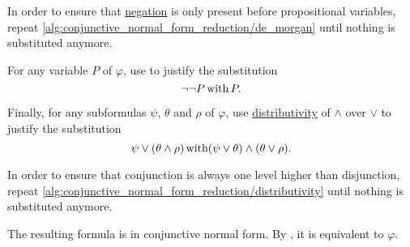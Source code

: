 \begin{algorithm}
\begin{thmenum}
    In order to ensure that \hyperref[def:propositional_language/negation]{negation} is only present before propositional variables, repeat \ref{alg:conjunctive_normal_form_reduction/de_morgan} until nothing is substituted anymore.

     For any variable \( P \) of \( \varphi \), use  to justify the substitution
    \begin{equation*}
      \neg \neg P \mathop{\text{with}} P.
    \end{equation*}

     Finally, for any subformulas \( \psi \), \( \theta \) and \( \rho \) of \( \varphi \), use \hyperref[eq:def:distributive_lattice/distributivity]{distributivity} of \( \wedge \) over \( \vee \) to justify the substitution
    \begin{equation*}
      \psi \vee (\theta \wedge \rho) \mathop{\text{with}} (\psi \vee \theta) \wedge (\theta \vee \rho).
    \end{equation*}

    In order to ensure that conjunction is always one level higher than disjunction, repeat \ref{alg:conjunctive_normal_form_reduction/distributivity} until nothing is substituted anymore.
  \end{thmenum}

  The resulting formula is in conjunctive normal form. By , it is equivalent to \( \varphi \).
\end{algorithm}
